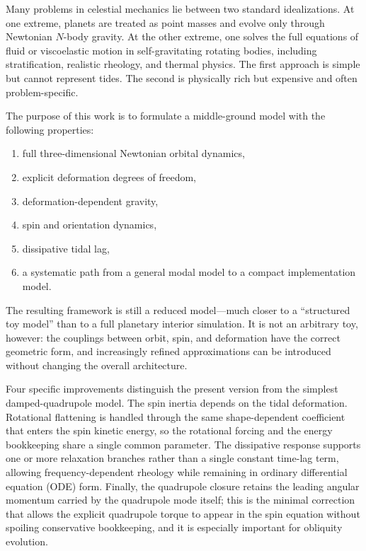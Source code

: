 \documentclass[journal, a4paper]{IEEEtran}
\begin{document}
Many problems in celestial mechanics lie between two standard idealizations.
At one extreme, planets are treated as point masses and evolve only through
Newtonian $N$-body gravity. At the other extreme, one solves the full
equations of fluid or viscoelastic motion in self-gravitating rotating
bodies, including stratification, realistic rheology, and thermal physics.
The first approach is simple but cannot represent tides. The second is
physically rich but expensive and often problem-specific.

The purpose of this work is to formulate a middle-ground model with the
following properties:
\begin{enumerate}
\item full three-dimensional Newtonian orbital dynamics,
\item explicit deformation degrees of freedom,
\item deformation-dependent gravity,
\item spin and orientation dynamics,
\item dissipative tidal lag,
\item a systematic path from a general modal model to a compact
implementation model.
\end{enumerate}

The resulting framework is still a reduced model---much closer to a
``structured toy model'' than to a full planetary interior simulation.
It is not an arbitrary toy, however: the couplings between orbit, spin, and
deformation have the correct geometric form, and increasingly refined
approximations can be introduced without changing the overall architecture.

Four specific improvements distinguish the present version from the simplest
damped-quadrupole model. The spin inertia depends on the tidal deformation.
Rotational flattening is handled through the same shape-dependent coefficient
that enters the spin kinetic energy, so the rotational forcing and the energy
bookkeeping share a single common parameter. The dissipative response supports
one or more relaxation branches rather than a single constant time-lag term,
allowing frequency-dependent rheology while remaining in ordinary differential
equation (ODE) form. Finally, the quadrupole closure retains the leading
angular momentum carried by the quadrupole mode itself; this is the minimal
correction that allows the explicit quadrupole torque to appear in the spin
equation without spoiling conservative bookkeeping, and it is especially
important for obliquity evolution.
\end{document}
